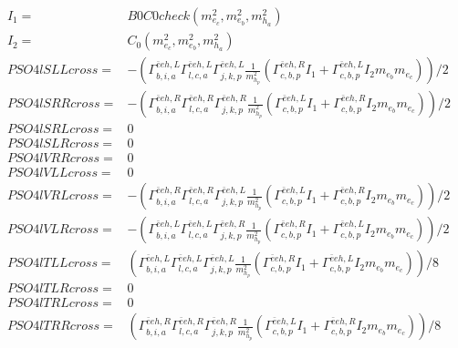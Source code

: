 \documentclass[A4,landscape]{article}
\begin{document}
\begin{align} 
I_1= & B0C0check(m^2_{e_{{c}}}, m^2_{e_{{b}}}, m^2_{h_{{a}}}) \\ 
I_2= & C_0(m^2_{e_{{c}}}, m^2_{e_{{b}}}, m^2_{h_{{a}}}) \\ 
  PSO4lSLLcross= & -( \Gamma^{\bar{e}e h ,L}_{b, i, a} \Gamma^{\bar{e}e h ,L}_{l, c, a} \Gamma^{\bar{e}e h ,L}_{j, k, p} \frac{1}{m^2_{h_{{p}}}} (\Gamma^{\bar{e}e h ,R}_{c, b, p} I_1 + \Gamma^{\bar{e}e h ,L}_{c, b, p} I_2 m_{e_{{b}}} m_{e_{{c}}}))/2 \\ 
  PSO4lSRRcross= & -( \Gamma^{\bar{e}e h ,R}_{b, i, a} \Gamma^{\bar{e}e h ,R}_{l, c, a} \Gamma^{\bar{e}e h ,R}_{j, k, p} \frac{1}{m^2_{h_{{p}}}} (\Gamma^{\bar{e}e h ,L}_{c, b, p} I_1 + \Gamma^{\bar{e}e h ,R}_{c, b, p} I_2 m_{e_{{b}}} m_{e_{{c}}}))/2 \\ 
  PSO4lSRLcross= & 0 \\ 
  PSO4lSLRcross= & 0 \\ 
  PSO4lVRRcross= & 0 \\ 
  PSO4lVLLcross= & 0 \\ 
  PSO4lVRLcross= & -( \Gamma^{\bar{e}e h ,R}_{b, i, a} \Gamma^{\bar{e}e h ,R}_{l, c, a} \Gamma^{\bar{e}e h ,L}_{j, k, p} \frac{1}{m^2_{h_{{p}}}} (\Gamma^{\bar{e}e h ,L}_{c, b, p} I_1 + \Gamma^{\bar{e}e h ,R}_{c, b, p} I_2 m_{e_{{b}}} m_{e_{{c}}}))/2 \\ 
  PSO4lVLRcross= & -( \Gamma^{\bar{e}e h ,L}_{b, i, a} \Gamma^{\bar{e}e h ,L}_{l, c, a} \Gamma^{\bar{e}e h ,R}_{j, k, p} \frac{1}{m^2_{h_{{p}}}} (\Gamma^{\bar{e}e h ,R}_{c, b, p} I_1 + \Gamma^{\bar{e}e h ,L}_{c, b, p} I_2 m_{e_{{b}}} m_{e_{{c}}}))/2 \\ 
  PSO4lTLLcross= & ( \Gamma^{\bar{e}e h ,L}_{b, i, a} \Gamma^{\bar{e}e h ,L}_{l, c, a} \Gamma^{\bar{e}e h ,L}_{j, k, p} \frac{1}{m^2_{h_{{p}}}} (\Gamma^{\bar{e}e h ,R}_{c, b, p} I_1 + \Gamma^{\bar{e}e h ,L}_{c, b, p} I_2 m_{e_{{b}}} m_{e_{{c}}}))/8 \\ 
  PSO4lTLRcross= & 0 \\ 
  PSO4lTRLcross= & 0 \\ 
  PSO4lTRRcross= & ( \Gamma^{\bar{e}e h ,R}_{b, i, a} \Gamma^{\bar{e}e h ,R}_{l, c, a} \Gamma^{\bar{e}e h ,R}_{j, k, p} \frac{1}{m^2_{h_{{p}}}} (\Gamma^{\bar{e}e h ,L}_{c, b, p} I_1 + \Gamma^{\bar{e}e h ,R}_{c, b, p} I_2 m_{e_{{b}}} m_{e_{{c}}}))/8 \\ 
\end{align} 
\end{document}
